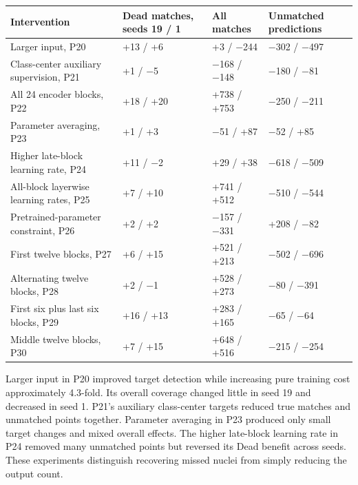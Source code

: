 \documentclass[
  11pt,
]{article}
\begin{document}
\begin{longtable}[]{@{}
  >{\raggedright\arraybackslash}p{}
  >{\raggedleft\arraybackslash}p{}
  >{\raggedleft\arraybackslash}p{}
  >{\raggedleft\arraybackslash}p{}@{}}
\toprule\noalign{}
\begin{minipage}[b]{\linewidth}\raggedright
Intervention
\end{minipage} & \begin{minipage}[b]{\linewidth}\raggedleft
Dead matches, seeds 19 / 1
\end{minipage} & \begin{minipage}[b]{\linewidth}\raggedleft
All matches
\end{minipage} & \begin{minipage}[b]{\linewidth}\raggedleft
Unmatched predictions
\end{minipage} \\
\midrule\noalign{}
\endhead
\bottomrule\noalign{}
\endlastfoot
Larger input, P20 & +13 / +6 & +3 / −244 & −302 / −497 \\
Class-center auxiliary supervision, P21 & +1 / −5 & −168 / −148 & −180 /
−81 \\
All 24 encoder blocks, P22 & +18 / +20 & +738 / +753 & −250 / −211 \\
Parameter averaging, P23 & +1 / +3 & −51 / +87 & −52 / +85 \\
Higher late-block learning rate, P24 & +11 / −2 & +29 / +38 & −618 /
−509 \\
All-block layerwise learning rates, P25 & +7 / +10 & +741 / +512 & −510
/ −544 \\
Pretrained-parameter constraint, P26 & +2 / +2 & −157 / −331 & +208 /
−82 \\
First twelve blocks, P27 & +6 / +15 & +521 / +213 & −502 / −696 \\
Alternating twelve blocks, P28 & +2 / −1 & +528 / +273 & −80 / −391 \\
First six plus last six blocks, P29 & +16 / +13 & +283 / +165 & −65 /
−64 \\
Middle twelve blocks, P30 & +7 / +15 & +648 / +516 & −215 / −254 \\
\end{longtable}

Larger input in P20 improved target detection while increasing pure
training cost approximately 4.3-fold. Its overall coverage changed
little in seed 19 and decreased in seed 1. P21's auxiliary class-center
targets reduced true matches and unmatched points together. Parameter
averaging in P23 produced only small target changes and mixed overall
effects. The higher late-block learning rate in P24 removed many
unmatched points but reversed its Dead benefit across seeds. These
experiments distinguish recovering missed nuclei from simply reducing
the output count.
\end{document}
